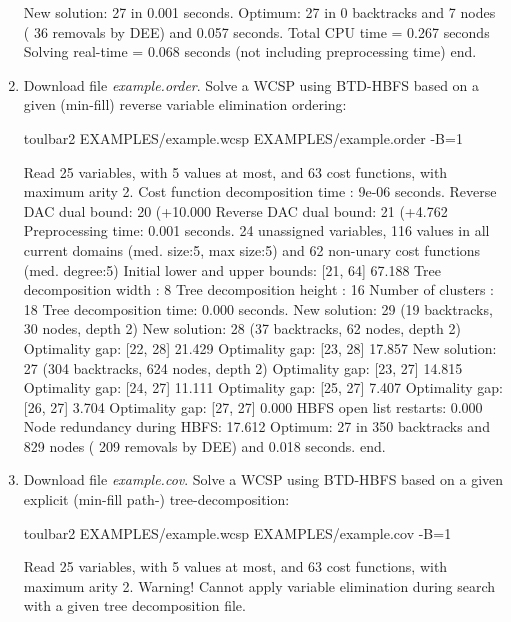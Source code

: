 \begin{enumerate}
{\begin{DoxyCode}
New solution: 27 in 0.001 seconds.
Optimum: 27 in 0 backtracks and 7 nodes ( 36 removals by DEE) and 0.057 seconds.
Total CPU time = 0.267 seconds
Solving real-time = 0.068 seconds (not including preprocessing time)
end.
\end{DoxyCode}}
\item Download file {\em example.order}. Solve a WCSP using BTD-HBFS based on a given (min-fill) reverse variable elimination ordering:
\begin{DoxyCode}
	toulbar2 EXAMPLES/example.wcsp EXAMPLES/example.order -B=1
\end{DoxyCode}
{\scriptsize
\begin{DoxyCode}
Read 25 variables, with 5 values at most, and 63 cost functions, with maximum arity 2.
Cost function decomposition time : 9e-06 seconds.
Reverse DAC dual bound: 20 (+10.000%
Reverse DAC dual bound: 21 (+4.762%
Preprocessing time: 0.001 seconds.
24 unassigned variables, 116 values in all current domains (med. size:5, max size:5) and 62 non-unary cost functions (med. degree:5)
Initial lower and upper bounds: [21, 64] 67.188%
Tree decomposition width  : 8
Tree decomposition height : 16
Number of clusters        : 18
Tree decomposition time: 0.000 seconds.
New solution: 29 (19 backtracks, 30 nodes, depth 2)
New solution: 28 (37 backtracks, 62 nodes, depth 2)
Optimality gap: [22, 28] 21.429 %
Optimality gap: [23, 28] 17.857 %
New solution: 27 (304 backtracks, 624 nodes, depth 2)
Optimality gap: [23, 27] 14.815 %
Optimality gap: [24, 27] 11.111 %
Optimality gap: [25, 27] 7.407 %
Optimality gap: [26, 27] 3.704 %
Optimality gap: [27, 27] 0.000 %
HBFS open list restarts: 0.000 %
Node redundancy during HBFS: 17.612 %
Optimum: 27 in 350 backtracks and 829 nodes ( 209 removals by DEE) and 0.018 seconds.
end.
\end{DoxyCode}}
\item Download file {\em example.cov}. Solve a WCSP using BTD-HBFS based on a given explicit (min-fill path-) tree-decomposition:
\begin{DoxyCode}
	toulbar2 EXAMPLES/example.wcsp EXAMPLES/example.cov -B=1
\end{DoxyCode}
{\scriptsize
\begin{DoxyCode}
Read 25 variables, with 5 values at most, and 63 cost functions, with maximum arity 2.
Warning! Cannot apply variable elimination during search with a given tree decomposition file.

\end{DoxyCode}}
\end{enumerate}
